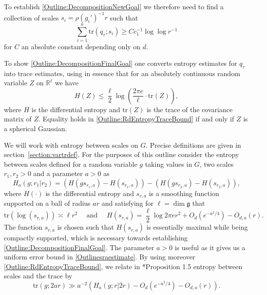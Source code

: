 \documentclass[10pt, english,oneside,reqno]{amsart}
\theoremstyle{plain}
\theoremstyle{remark}
\numberwithin{equation}{section}
\numberwithin{figure}{section}
\newcommand{\tr}{\mathrm{tr}}
\newcommand{\R}{\mathbb{R}}
\begin{document}
To establish \eqref{Outline:DecompositionNewGoal} we therefore need to find a collection of scales $s_i = \rho(g_i')^{-1}r$ such that 
\begin{equation}\label{Outline:DecompositionFinalGoal}
    \sum_{i = 1}^n \mathrm{tr}(q_{\tau}; s_i) \geq C c_1^{-1} \log \log r^{-1}
\end{equation} for $C$ an absolute constant depending only on $d$.

To show \eqref{Outline:DecompositionFinalGoal} one converts entropy estimates for $q_{\tau}$ into trace estimates, using in essence that for an absolutely continuous random variable $Z$ on $\R^{\ell}$ we have
\begin{equation}\label{Outline:RdEntropyTraceBound}
    H(Z) \leq \frac{\ell}{2}\log\left(\frac{2\pi e}{\ell} \cdot \tr(Z)\right),
\end{equation}
where $H$ is the differential entropy and $\tr(Z)$ is the trace of the covariance matrix of $Z$. Equality holds in \eqref{Outline:RdEntropyTraceBound} if and only if $Z$ is a spherical Gaussian.

We will work with entropy between scales on $G$. Precise definitions are given in section~\ref{section:vartrdef}. For the purposes of this outline consider the entropy between scales  defined for a random variable $g$ taking values in $G$, two scales $r_1,r_2 > 0$ and a parameter $a > 0$ as $$H_a(g; r_1| r_2) = (H(gs_{r_1,a}) - H(s_{r_1,a})) - (H(gs_{r_2,a}) - H(s_{r_2,a})),$$ where $H(\cdot)$ is the differential entropy and $s_{r,a}$ is a smoothing function supported on a ball of radius $ar$ and satisfying for $\ell = \dim \mathfrak{g}$ that
\begin{equation}\label{Outlinesraestimate}
    \mathrm{tr}(\log(s_{r,a})) \asymp \ell r^2 \quad \text{ and } \quad H(s_{r,a}) = \frac{\ell}{2}\log 2\pi e r^2 + O_d(e^{-a^2/4}) - O_{d,a}(r).
\end{equation}
The function $s_{r,a}$ is chosen such that $H(s_{r,a})$ is essentially maximal while being compactly supported, which is necessary towards establishing \eqref{Outline:DecompositionFinalGoal}. The parameter $a > 0$ is useful as it gives us a uniform error bound in \eqref{Outlinesraestimate}. By using moreover \eqref{Outline:RdEntropyTraceBound}, we relate in \cite{KittleKoglerEntropy}*{Proposition 1.5} entropy between scales and the trace by 
\begin{equation}\label{Outline:EntropyTraceBound}
    \tr(g; 2ar) \gg a^{-2}(H_a(g;r|2r) - O_d(e^{-a^2/4}) - O_{d,a}(r)).
\end{equation}
\end{document}
